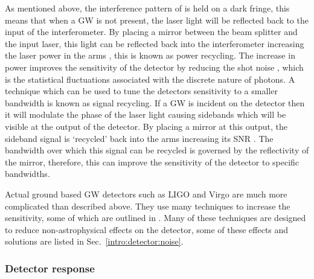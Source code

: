 As mentioned above, the interference pattern of is held on a dark fringe, this
means that when a \gls{GW} is not present, the laser light will be reflected
back to the input of the interferometer.  By placing a mirror between the beam
splitter and the input laser, this light can be reflected back into the
interferometer increasing the laser power in the arms
\citep{pitkin2011GravitationalWave}, this is known as power recycling. The
increase in power improves the sensitivity of the detector by reducing the shot
noise \citep{abbott2009LIGOLaser}, which is the statistical fluctuations
associated with the discrete nature of photons.  A technique which can be used
to tune the detectors sensitivity to a smaller bandwidth is known as signal
recycling.  If a \gls{GW} is incident on the detector then it will modulate the phase of the laser light causing
sidebands which will be visible at the output of the
detector.
By placing a mirror at this output, the sideband signal is `recycled' back into
the arms increasing its \gls{SNR} \citep{pitkin2011GravitationalWave}. The
bandwidth over which this signal can be recycled is governed by the
reflectivity of the mirror, therefore, this can improve the sensitivity of the
detector to specific bandwidths. 

Actual ground based \gls{GW} detectors such as \gls{LIGO} \citep{abbott2009LIGOLaser} and
Virgo \citep{acernese2015AdvancedVirgo} are much more complicated than
described above.  They use many techniques to increase the sensitivity, some of
which are outlined in \citep{aasi2015AdvancedLIGO,abbott2009LIGOLaser}.  Many of these techniques are
designed to reduce non-astrophysical effects on the detector,
some of these effects and solutions are listed in
Sec.~\ref{intro:detector:noise}.

\subsubsection{\label{intro:detector:response}Detector response}


